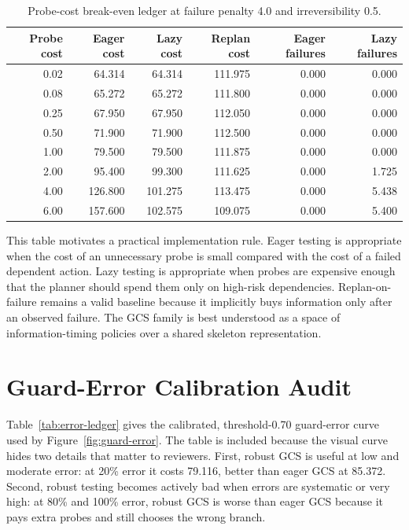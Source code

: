 \documentclass{article}
\begin{document}
\begin{table}[p]
\centering
\caption{Probe-cost break-even ledger at failure penalty 4.0 and irreversibility 0.5.}
\label{tab:probe-break-even}
\small
\begin{tabular}{rrrrrr}
\toprule
Probe cost & Eager cost & Lazy cost & Replan cost & Eager failures & Lazy failures\\
\midrule
0.02 & 64.314 & 64.314 & 111.975 & 0.000 & 0.000\\
0.08 & 65.272 & 65.272 & 111.800 & 0.000 & 0.000\\
0.25 & 67.950 & 67.950 & 112.050 & 0.000 & 0.000\\
0.50 & 71.900 & 71.900 & 112.500 & 0.000 & 0.000\\
1.00 & 79.500 & 79.500 & 111.875 & 0.000 & 0.000\\
2.00 & 95.400 & 99.300 & 111.625 & 0.000 & 1.725\\
4.00 & 126.800 & 101.275 & 113.475 & 0.000 & 5.438\\
6.00 & 157.600 & 102.575 & 109.075 & 0.000 & 5.400\\
\bottomrule
\end{tabular}
\end{table}

This table motivates a practical implementation rule. Eager testing is appropriate when the cost of an unnecessary probe is small compared with the cost of a failed dependent action. Lazy testing is appropriate when probes are expensive enough that the planner should spend them only on high-risk dependencies. Replan-on-failure remains a valid baseline because it implicitly buys information only after an observed failure. The GCS family is best understood as a space of information-timing policies over a shared skeleton representation.

\section{Guard-Error Calibration Audit}
Table~\ref{tab:error-ledger} gives the calibrated, threshold-0.70 guard-error curve used by Figure~\ref{fig:guard-error}. The table is included because the visual curve hides two details that matter to reviewers. First, robust GCS is useful at low and moderate error: at 20\% error it costs 79.116, better than eager GCS at 85.372. Second, robust testing becomes actively bad when errors are systematic or very high: at 80\% and 100\% error, robust GCS is worse than eager GCS because it pays extra probes and still chooses the wrong branch.
\end{document}
